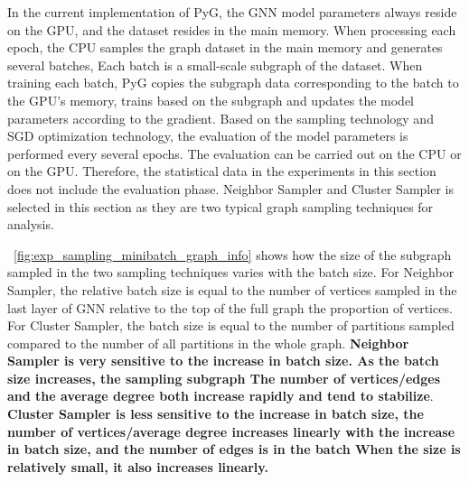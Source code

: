 In the current implementation of PyG, the GNN model parameters always reside on the GPU,
and the dataset resides in the main memory. When processing each epoch, the CPU samples
the graph dataset in the main memory and generates several batches,
Each batch is a small-scale subgraph of the dataset. When training each batch,
PyG copies the subgraph data corresponding to the batch to the GPU's memory,
trains based on the subgraph and updates the model parameters according to the gradient.
Based on the sampling technology and SGD optimization technology,
the evaluation of the model parameters is performed every several epochs.
The evaluation can be carried out on the CPU or on the GPU.
Therefore, the statistical data in the experiments in this section does not include the evaluation phase.
Neighbor Sampler and Cluster Sampler is selected in this section as they are two typical graph sampling techniques for analysis.

\figurename~\ref{fig:exp_sampling_minibatch_graph_info} shows how the size of the subgraph sampled in the two sampling techniques varies with the batch size.
For Neighbor Sampler, the relative batch size is equal to the number of vertices sampled in the last layer of GNN relative to the top of the full graph the proportion of vertices.
For Cluster Sampler, the batch size is equal to the number of partitions sampled compared to the number of all partitions in the whole graph.
\textbf{Neighbor Sampler is very sensitive to the increase in batch size. As the batch size increases,
    the sampling subgraph The number of vertices/edges and the average degree both increase rapidly and tend to stabilize}.
\textbf{Cluster Sampler is less sensitive to the increase in batch size, the number of vertices/average degree increases
    linearly with the increase in batch size, and the number of edges is in the batch When the size is relatively small,
    it also increases linearly.}

